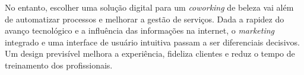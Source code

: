 No entanto, escolher uma solução digital para um \emph{coworking} de beleza vai além de automatizar processos e melhorar a gestão de serviços. Dada a rapidez do avanço tecnológico e a influência das informações na internet, o \emph{marketing} integrado e uma interface de usuário intuitiva passam a ser diferenciais decisivos. Um design previsível melhora a experiência, fideliza clientes e reduz o tempo de treinamento dos profissionais.
